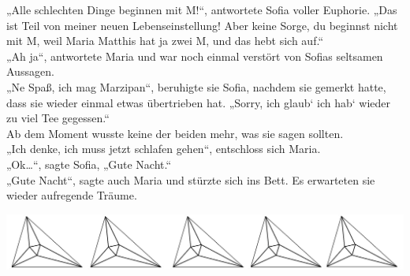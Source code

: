 \documentclass[oneside]{memoir}
\newcommand{\parasep}{
\bigskip
\bigskip
\begin{center} 
   \includegraphics[scale=.08]{parasep5.jpg} 
\end{center}
\bigskip
\bigskip
}
\begin{document}
„Alle schlechten Dinge beginnen mit M!“, antwortete Sofia voller Euphorie. „Das ist Teil von meiner neuen Lebenseinstellung! Aber keine Sorge, du beginnst nicht mit M, weil Maria Matthis hat ja zwei M, und das hebt sich auf.“  \\ 
„Ah ja“, antwortete Maria und war noch einmal verstört von Sofias seltsamen Aussagen.  \\ 
„Ne Spaß, ich mag Marzipan“, beruhigte sie Sofia, nachdem sie gemerkt hatte, dass sie wieder einmal etwas übertrieben hat.
„Sorry, ich glaub‘ ich hab‘ wieder zu viel Tee gegessen.“ \\
Ab dem Moment wusste keine der beiden mehr, was sie sagen sollten.  \\ 
„Ich denke, ich muss jetzt schlafen gehen“, entschloss sich Maria. \\
„Ok\ldots“, sagte Sofia, „Gute Nacht.“ \\ 
„Gute Nacht“, sagte auch Maria und stürzte sich ins Bett. 
Es erwarteten sie wieder aufregende Träume.
     
     \parasep
     
\end{document}

